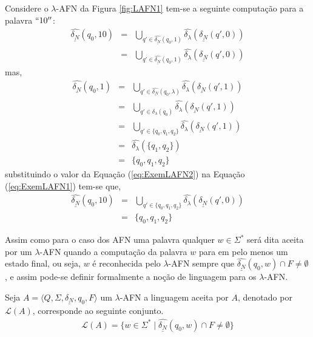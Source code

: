 \begin{example}
	Considere o $\lambda$-AFN da Figura \ref{fig:LAFN1} tem-se a seguinte computação para a palavra $``10''$:
	\begin{eqnarray}\label{eq:ExemLAFN1}
		\widehat{\underline{\delta_N}}(q_0, 10) & = & \bigcup_{q' \in \widehat{\underline{\delta_N}}(q_0, 1)} \widehat{\delta_\lambda}(\underline{\delta_N}(q', 0))\nonumber\\
		& = & \bigcup_{q' \in \widehat{\underline{\delta_N}}(q_0, 1)} \widehat{\delta_\lambda}(\underline{\delta_N}(q', 0))
	\end{eqnarray}
	mas,
	\begin{eqnarray}\label{eq:ExemLAFN2}
		\widehat{\underline{\delta_N}}(q_0, 1) & = & \bigcup_{q' \in \widehat{\underline{\delta_N}}(q_0, \lambda)} \widehat{\delta_\lambda}(\underline{\delta_N}(q', 1))\nonumber\\
		& = & \bigcup_{q' \in \delta_\lambda(q_0)} \widehat{\delta_\lambda}(\underline{\delta_N}(q', 1))\nonumber\\
		& = & \bigcup_{q' \in \{q_0, q_1, q_2\}} \widehat{\delta_\lambda}(\underline{\delta_N}(q', 1))\\
		& = & \widehat{\delta_\lambda}(\{q_1, q_2\})\nonumber\\
		& = & \{q_0, q_1, q_2\}\nonumber
	\end{eqnarray}
	substituindo o valor da Equação (\ref{eq:ExemLAFN2}) na Equação (\ref{eq:ExemLAFN1}) tem-se que, 
	\begin{eqnarray*}
		\widehat{\underline{\delta_N}}(q_0, 10) & = & \bigcup_{q' \in \{q_0, q_1, q_2\}} \widehat{\delta_\lambda}(\underline{\delta_N}(q', 0))\\
		& = & \{q_0, q_1, q_2\}
	\end{eqnarray*}
\end{example}

Assim como para o caso dos AFN uma palavra qualquer $w \in \Sigma^*$ será dita aceita por um $\lambda$-AFN quando a computação da palavra $w$ para em pelo menos um estado final, ou seja, $w$ é reconhecida pelo $\lambda$-AFN sempre que $\widehat{\underline{\delta_N}}(q_0, w) \cap F \neq \emptyset$, e assim pode-se definir formalmente a noção de linguagem para os $\lambda$-AFN.

\begin{definition}\label{def:LinguagelLAFN}
	Seja $A = \langle Q, \Sigma, \underline{\delta_N}, q_0, F\rangle$ um $\lambda$-AFN a linguagem aceita por $A$, denotado por $\mathcal{L}(A)$, corresponde ao seguinte conjunto.
	\begin{eqnarray}
		\mathcal{L}(A) = \{w \in \Sigma^* \mid \widehat{\underline{\delta_N}}(q_0, w) \cap F \neq \emptyset\}
	\end{eqnarray}
\end{definition}

